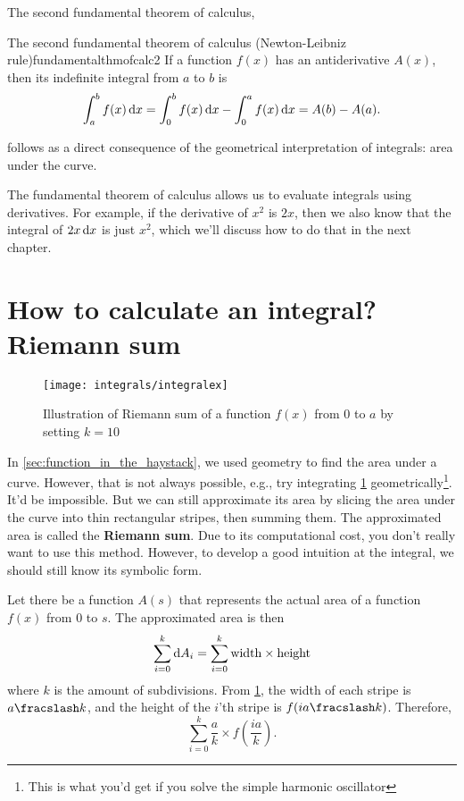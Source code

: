 The second fundamental theorem of calculus,
\begin{theorem}{The second fundamental theorem of calculus (Newton-Leibniz rule)}{fundamentalthmofcalc2}
    If a function $f(x)$ has an antiderivative $A(x)$, then its indefinite integral from $a$ to $b$ is
    \begin{equation}
        \int_{a}^{b}f(x)\odif{x} = \int_{0}^{b}f(x)\odif{x} - \int_{0}^{a}f(x)\odif{x} = A(b) - A(a).
    \end{equation}
\end{theorem}
follows as a direct consequence of the geometrical interpretation of integrals: area under the curve.

The fundamental theorem of calculus allows us to evaluate integrals using derivatives. For example, if the derivative of $x^2$ is $2x$, then we also know that the integral of $2x\odif{x}$ is just $x^2$, which we'll discuss how to do that in the next chapter.

\section{How to calculate an integral? Riemann sum}
\label{sec:riemann_sum}

\begin{figure}[b]
    \centering
    \texttt{[image: integrals/integralex]}
    \caption{Illustration of Riemann sum of a function $f(x)$ from $0$ to $a$ by setting $k = 10$}
    \label{fig:integralex1}
\end{figure}

In \cref{sec:function_in_the_haystack}, we used geometry to find the area under a curve. However, that is not always possible, e.g., try integrating \cref{fig:integralex1} geometrically\footnote{This is what you'd get if you solve the simple harmonic oscillator}. It'd be impossible. But we can still approximate its area by slicing the area under the curve into thin rectangular stripes, then summing them. The approximated area is called the \textbf{Riemann sum}. Due to its computational cost, you don't really want to use this method. However, to develop a good intuition at the integral, we should still know its symbolic form.

Let there be a function $A(s)$ that represents the actual area of a function $f(x)$ from $0$ to $s$. The approximated area is then
\begin{equation}
    \sum_{i = 0}^{k}\odif{A_i} = \sum_{i = 0}^{k}\mathrm{width} \times \mathrm{height}
\end{equation}
where $k$ is the amount of subdivisions. From \cref{fig:integralex1}, the width of each stripe is $\flatfrac{a}{k}$, and the height of the $i$'th stripe is $f(\flatfrac{ia}{k})$. Therefore,
\begin{equation*}
    \sum_{i = 0}^{k}\frac{a}{k}\times f\left(\frac{ia}{k}\right).
\end{equation*}

